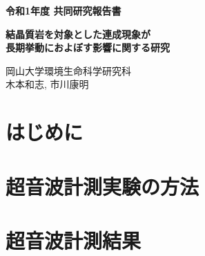 ﻿\documentclass[11pt,a4j]{jarticle}
\newlength{\minitwocolumn}
\begin{document}
\newcommand{\fat}[1]{\mbox{\boldmath $#1$}}
\newcommand{\D}{\partial}
\newcommand{\w}{\omega}
\newcommand{\ga}{\alpha}
\newcommand{\gb}{\beta}
\newcommand{\gx}{\xi}
\newcommand{\gz}{\zeta}
\newcommand{\vhat}[1]{\hat{\fat{#1}}}
\newcommand{\spc}{\vspace{0.7\baselineskip}}
\newcommand{\halfspc}{\vspace{0.3\baselineskip}}

\newcommand{\twofig}[2]
 {
   \begin{figure}[h]
     \begin{minipage}[t]{\minitwocolumn}
         \begin{center}   #1
         \end{center}
     \end{minipage}
         \hspace{\columnsep}
     \begin{minipage}[t]{\minitwocolumn}
         \begin{center} #2
         \end{center}
     \end{minipage}
   \end{figure}
 }
\begin{center}
{\Large \bf 令和1年度 共同研究報告書}
\end{center}
\vspace{2mm}
\begin{center}
{\LARGE \bf 結晶質岩を対象とした連成現象が\\
長期挙動におよぼす影響に関する研究} 
\end{center}
\begin{center}
岡山大学環境生命科学研究科\\
木本和志, 市川康明
\end{center}
\vspace{10mm}
\section{はじめに}
%
\section{超音波計測実験の方法}

\section{超音波計測結果}

\end{document}
